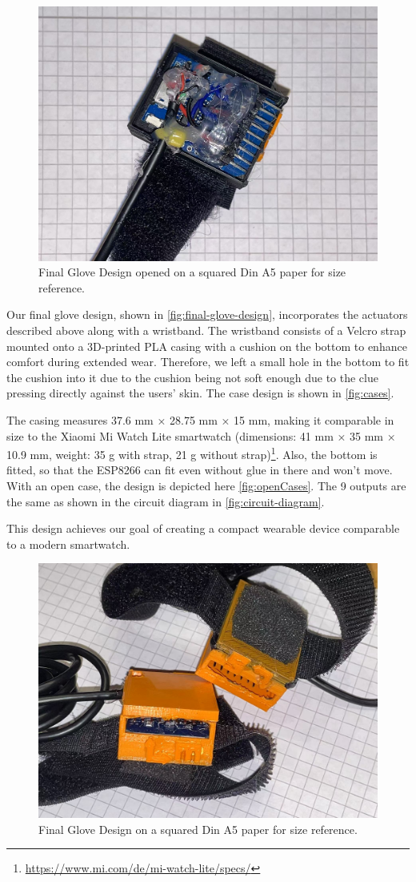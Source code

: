 \begin{figure}
    \centering
    \includegraphics[width=0.5\linewidth]{src/pictures/GloveDesigns/openCase.jpg}
    \caption{Final Glove Design opened on a squared Din A5 paper for size reference.}
    \label{fig:openCases}
\end{figure}

Our final glove design, shown in \autoref{fig:final-glove-design}, incorporates the actuators described above along with a wristband. The wristband consists of a Velcro strap mounted onto a 3D-printed PLA casing with a cushion on the bottom to enhance comfort during extended wear. Therefore, we left a small hole in the bottom to fit the cushion into it due to the cushion being not soft enough due to the clue pressing directly against the users' skin. The case design is shown in \autoref{fig:cases}.

The casing measures 37.6 mm × 28.75 mm × 15 mm, making it comparable in size to the Xiaomi Mi Watch Lite smartwatch (dimensions: 41 mm × 35 mm × 10.9 mm, weight: 35 g with strap, 21 g without strap)\footnote{\url{https://www.mi.com/de/mi-watch-lite/specs/}}. Also, the bottom is fitted, so that the ESP8266 can fit even without glue in there and won't move.
With an open case, the design is depicted here \autoref{fig:openCases}. The 9 outputs are the same as shown in the circuit diagram in \autoref{fig:circuit-diagram}.

This design achieves our goal of creating a compact wearable device comparable to a modern smartwatch.

\begin{figure}
    \centering
    \includegraphics[width=0.5\linewidth]{src/pictures/GloveDesigns/casesFinished.jpg}
    \caption{Final Glove Design on a squared Din A5 paper for size reference.}
    \label{fig:final-glove-design}
\end{figure}


